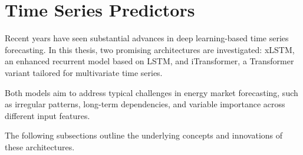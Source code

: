 \documentclass[class=scrbook, crop=false]{standalone}
\begin{document}





\section{Time Series Predictors}
\label{Section::Time_Series_Predictors}
Recent years have seen substantial advances in deep learning-based time series forecasting. In this thesis, two promising architectures are investigated: xLSTM, an enhanced recurrent model based on LSTM, and iTransformer, a Transformer variant tailored for multivariate time series.

Both models aim to address typical challenges in energy market forecasting, such as irregular patterns, long-term dependencies, and variable importance across different input features.

The following subsections outline the underlying concepts and innovations of these architectures.


\end{document}
